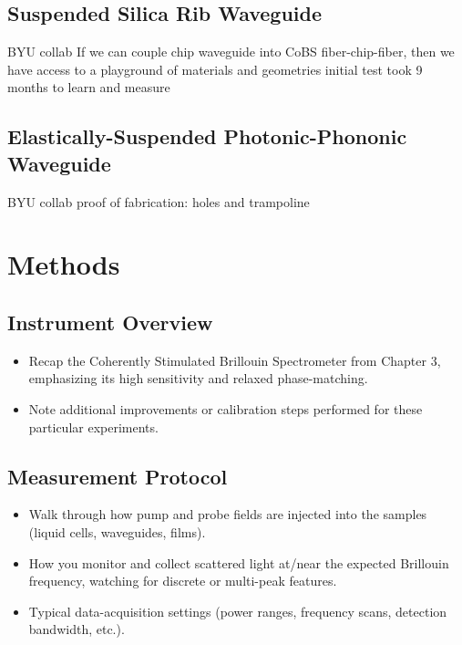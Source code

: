 \subsection{Suspended Silica Rib Waveguide}
\label{subsec:Raman:Target:Waveguide}

BYU collab
If we can couple chip waveguide into CoBS fiber-chip-fiber, then we have access to a playground of materials and geometries
initial test took 9 months to learn and measure


\subsection{Elastically-Suspended Photonic-Phononic Waveguide}
\label{subsec:Raman:Target:WigglyWaveguide}

BYU collab
proof of fabrication: holes and trampoline


\section{Methods}
\label{sec:Raman:Methods}

\subsection{Instrument Overview}
\label{subsec:Raman:InstrumentOverview}

\begin{itemize}
  \item Recap the Coherently Stimulated Brillouin Spectrometer from Chapter 3, emphasizing its high sensitivity and relaxed phase-matching.
  \item Note additional improvements or calibration steps performed for these particular experiments.
\end{itemize}

\subsection{Measurement Protocol}
\label{subsec:Raman:MeasurementProtocol}

\begin{itemize}
  \item Walk through how pump and probe fields are injected into the samples (liquid cells, waveguides, films).
  \item How you monitor and collect scattered light at/near the expected Brillouin frequency, watching for discrete or multi-peak features.
  \item Typical data-acquisition settings (power ranges, frequency scans, detection bandwidth, etc.).
\end{itemize}

